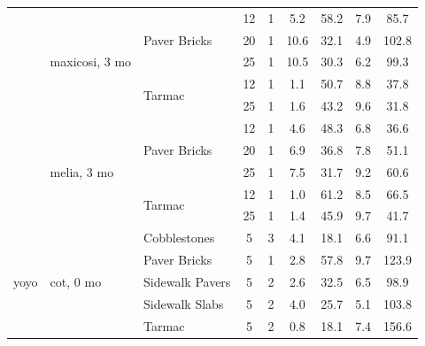 \documentclass[a4paper]{article}
\begin{document}
\begin{table}
\begin{tabular}{lllcccccc}
\cline{2-9} \cline{3-9}
 & \multirow[t]{5}{*}{maxicosi, 3 mo} & \multirow[t]{3}{*}{Paver Bricks} & 12 & 1 & 5.2 & 58.2 & 7.9 & 85.7 \\
 &  &  & 20 & 1 & 10.6 & 32.1 & 4.9 & 102.8 \\
 &  &  & 25 & 1 & 10.5 & 30.3 & 6.2 & 99.3 \\
\cline{3-9}
 &  & \multirow[t]{2}{*}{Tarmac} & 12 & 1 & 1.1 & 50.7 & 8.8 & 37.8 \\
 &  &  & 25 & 1 & 1.6 & 43.2 & 9.6 & 31.8 \\
\cline{2-9} \cline{3-9}
 & \multirow[t]{5}{*}{melia, 3 mo} & \multirow[t]{3}{*}{Paver Bricks} & 12 & 1 & 4.6 & 48.3 & 6.8 & 36.6 \\
 &  &  & 20 & 1 & 6.9 & 36.8 & 7.8 & 51.1 \\
 &  &  & 25 & 1 & 7.5 & 31.7 & 9.2 & 60.6 \\
\cline{3-9}
 &  & \multirow[t]{2}{*}{Tarmac} & 12 & 1 & 1.0 & 61.2 & 8.5 & 66.5 \\
 &  &  & 25 & 1 & 1.4 & 45.9 & 9.7 & 41.7 \\
\cline{1-9} \cline{2-9} \cline{3-9}
\multirow[t]{5}{*}{yoyo} & \multirow[t]{5}{*}{cot, 0 mo} & Cobblestones & 5 & 3 & 4.1 & 18.1 & 6.6 & 91.1 \\
\cline{3-9}
 &  & Paver Bricks & 5 & 1 & 2.8 & 57.8 & 9.7 & 123.9 \\
\cline{3-9}
 &  & Sidewalk Pavers & 5 & 2 & 2.6 & 32.5 & 6.5 & 98.9 \\
\cline{3-9}
 &  & Sidewalk Slabs & 5 & 2 & 4.0 & 25.7 & 5.1 & 103.8 \\
\cline{3-9}
 &  & Tarmac & 5 & 2 & 0.8 & 18.1 & 7.4 & 156.6 \\
\cline{1-9} \cline{2-9} \cline{3-9}
\bottomrule
\end{tabular}
\end{table}
\end{document}

